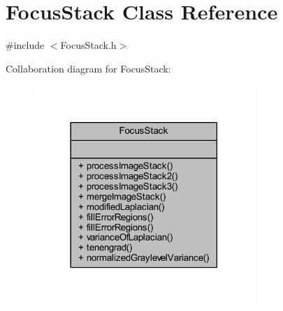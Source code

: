 \hypertarget{class_focus_stack}{}\section{Focus\+Stack Class Reference}
\label{class_focus_stack}


{\ttfamily \#include $<$Focus\+Stack.\+h$>$}



Collaboration diagram for Focus\+Stack\+:
\nopagebreak
\begin{figure}[H]
\begin{center}
\leavevmode
\includegraphics[width=237pt]{class_focus_stack__coll__graph}
\end{center}
\end{figure}
